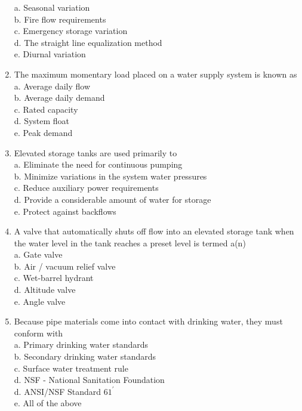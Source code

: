\documentclass{article}
\begin{document}
\begin{enumerate}[1.]
a. Seasonal variation\\

b. Fire flow requirements\\

c. Emergency storage variation\\

d. The straight line equalization method\\

e. Diurnal variation\\

  \item The maximum momentary load placed on a water supply system is known as\\
a. Average daily flow\\
b. Average daily demand\\
c. Rated capacity\\
d. System float\\
e. Peak demand\\

\item Elevated storage tanks are used primarily to\\
a. Eliminate the need for continuous pumping\\
b. Minimize variations in the system water pressures\\
c. Reduce auxiliary power requirements\\
d. Provide a considerable amount of water for storage\\
e. Protect against backflows

\item A valve that automatically shuts off flow into an elevated storage tank when the water level in the tank reaches a preset level is termed a(n)\\
a. Gate valve\\
b. Air / vacuum relief valve\\
c. Wet-barrel hydrant\\
d. Altitude valve\\
e. Angle valve

  \item Because pipe materials come into contact with drinking water, they must conform with\\
a. Primary drinking water standards\\
b. Secondary drinking water standards\\
c. Surface water treatment rule\\
d. NSF - National Sanitation Foundation\\
d. ANSI/NSF Standard $61^{\prime}$\\
e. All of the above\\


\end{enumerate}
\end{document}

